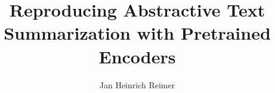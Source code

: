 \documentclass[english,acmlarge,nonacm,natbib=false,urlbreakonhyphens=false,screen,11pt]{acmart}
\title{Reproducing Abstractive Text Summarization with Pretrained Encoders}
\author{Jan Heinrich Reimer}
\affiliation{
    \institution{Martin Luther University Halle-Wittenberg}
    \streetaddress{Von-Seckendorff-Platz~1}
    \postcode{06108}
    \city{Halle (Saale)}
    \country{Germany}
}
\begin{document}
\begin{abstract}
    
\end{abstract}

\maketitle







\printbibliography
\end{document}
